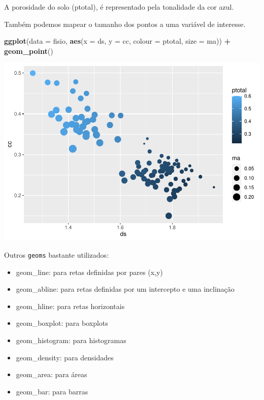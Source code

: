 \documentclass[
]{book}
\newenvironment{Shaded}{\begin{snugshade}}{\end{snugshade}}
\newcommand{\DataTypeTok}[1]{\textcolor[rgb]{0.13,0.29,0.53}{#1}}
\newcommand{\KeywordTok}[1]{\textcolor[rgb]{0.13,0.29,0.53}{\textbf{#1}}}
\newcommand{\NormalTok}[1]{#1}
\newcommand{\OperatorTok}[1]{\textcolor[rgb]{0.81,0.36,0.00}{\textbf{#1}}}
\newcommand{\StringTok}[1]{\textcolor[rgb]{0.31,0.60,0.02}{#1}}
\providecommand{\tightlist}{%
  \setlength{\itemsep}{0pt}\setlength{\parskip}{0pt}}
\begin{document}
A porosidade do solo (ptotal), é representado pela tonalidade da cor azul.

Também podemos mapear o tamanho dos pontos a uma variável de interesse.

\begin{Shaded}
\begin{Highlighting}[]
\KeywordTok{ggplot}\NormalTok{(}\DataTypeTok{data =}\NormalTok{ fisio, }\KeywordTok{aes}\NormalTok{(}\DataTypeTok{x =}\NormalTok{ ds, }\DataTypeTok{y =}\NormalTok{ cc, }\DataTypeTok{colour =}\NormalTok{ ptotal, }\DataTypeTok{size =}\NormalTok{ ma)) }\OperatorTok{+}
\StringTok{  }\KeywordTok{geom_point}\NormalTok{()}
\end{Highlighting}
\end{Shaded}

\includegraphics{TudodoR_files/figure-latex/unnamed-chunk-189-1.pdf}

Outros \texttt{geoms} bastante utilizados:

\begin{itemize}
\tightlist
\item
  geom\_line: para retas definidas por pares (x,y)
\item
  geom\_abline: para retas definidas por um intercepto e uma inclinação
\item
  geom\_hline: para retas horizontais
\item
  geom\_boxplot: para boxplots
\item
  geom\_histogram: para histogramas
\item
  geom\_density: para densidades
\item
  geom\_area: para áreas
\item
  geom\_bar: para barras
\end{itemize}
\end{document}

